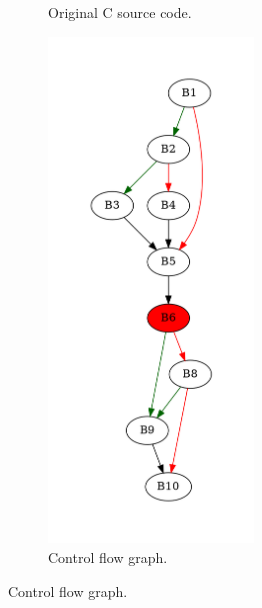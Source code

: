 \begin{figure}[htbp]
	\centering
	\begin{subfigure}[b]{0.30\textwidth}
		\centering
		
		\caption{Original C source code.}
	\end{subfigure}
	\begin{subfigure}[b]{0.50\textwidth}
		\centering
		\includegraphics[width=0.6\textwidth]{inc/appendices/examples/hammock/counter-example/jump-threading-and-short-circuit/jump-threading-and-short-circuit_jump/f_0003b.png}
		\caption{Control flow graph.}
	\end{subfigure}
\end{figure}

